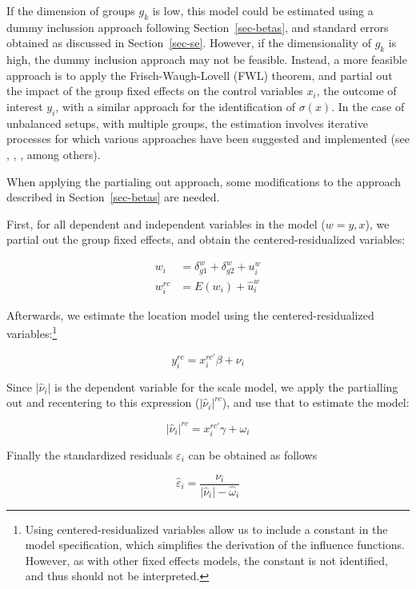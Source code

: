 \documentclass[
  authoryear,
  review,
  1p]{elsarticle}
\begin{document}
If the dimension of groups \(g_k\) is low, this model could be estimated
using a dummy inclussion approach following Section~\ref{sec-betas}, and
standard errors obtained as discussed in Section~\ref{sec-se}. However,
if the dimensionality of \(g_k\) is high, the dummy inclusion approach
may not be feasible. Instead, a more feasible approach is to apply the
Frisch-Waugh-Lovell (FWL) theorem, and partial out the impact of the
group fixed effects on the control variables \(x_{i}\), the outcome of
interest \(y_{i}\), with a similar approach for the identification of
\(\sigma(x)\). In the case of unbalanced setups, with multiple groups,
the estimation involves iterative processes for which various approaches
have been suggested and implemented (see
\citet{correia_feasible_nodate}, \citet{gaure2013}, \citet{rios2015},
among others).

When applying the partialing out approach, some modifications to the
approach described in Section~\ref{sec-betas} are needed.

First, for all dependent and independent variables in the model
(\(w=y,x\)), we partial out the group fixed effects, and obtain the
centered-residualized variables:

\[\begin{aligned}
w_{i} &= \delta_{g1}^w + \delta_{g2}^w + u_{i}^w \\
w_{i}^{rc} &= E(w_{i}) + \hat{u}_{i}^w
\end{aligned}
\]

Afterwards, we estimate the location model using the
centered-residualized variables:\footnote{Using centered-residualized
  variables allow us to include a constant in the model specification,
  which simplifies the derivation of the influence functions. However,
  as with other fixed effects models, the constant is not identified,
  and thus should not be interpreted.}

\[y_{i}^{rc} = x_{i}^{rc'} \beta + \nu_{i}
\]

Since \(|\hat \nu_i|\) is the dependent variable for the scale model, we
apply the partialling out and recentering to this expression
(\(|\hat \nu_i|^{rc}\)), and use that to estimate the model:

\[|\hat\nu_{i}|^{rc} = x_{i}^{rc'} \gamma + \omega_{i}\]

Finally the standardized residuals \(\varepsilon_i\) can be obtained as
follows

\[\hat{\varepsilon}_{i} = \frac{\nu_{i}}{|\hat\nu_{i}|- \hat \omega_{i}}\]
\end{document}
